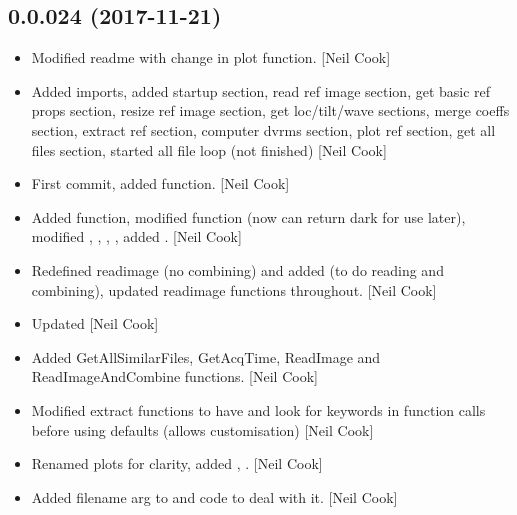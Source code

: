\documentclass[a4paper,10pt,english]{report}
\begin{document}
\subsection{0.0.024 (2017-11-21)}
\label{\detokenize{misc/changelog:id528}}\begin{itemize}
\item {} 
Modified readme with change in plot function. {[}Neil Cook{]}

\item {} 
Added imports, added startup section, read ref image section, get
basic ref props section, resize ref image section, get loc/tilt/wave
sections, merge coeffs section, extract ref section, computer dvrms
section, plot ref section, get all files section, started all file
loop (not finished) {[}Neil Cook{]}

\item {} 
First commit, added  function. {[}Neil Cook{]}

\item {} 
Added  function, modified 
function (now can return dark for use later), modified ,
, , , added . {[}Neil Cook{]}

\item {} 
Redefined readimage (no combining) and added  (to
do reading and combining), updated readimage functions throughout.
{[}Neil Cook{]}

\item {} 
Updated  {[}Neil Cook{]}

\item {} 
Added GetAllSimilarFiles, GetAcqTime, ReadImage and
ReadImageAndCombine functions. {[}Neil Cook{]}

\item {} 
Modified extract functions to have and look for keywords in function
calls before using defaults (allows customisation) {[}Neil Cook{]}

\item {} 
Renamed plots for clarity, added ,
. {[}Neil Cook{]}

\item {} 
Added filename arg to  and code to deal with it.
{[}Neil Cook{]}


\end{itemize}
\end{document}
